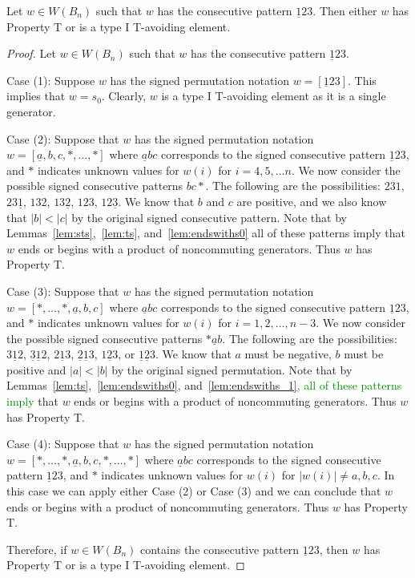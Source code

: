 \begin{lemma}\label{lem:123}
Let $w \in W(B_n)$ such that $w$ has the consecutive pattern $\underline{1}23$. Then either $w$ has Property T or is a type I T-avoiding element.
\begin{proof}
	Let $w \in W(B_n)$ such that $w$ has the consecutive pattern $\underline{1}23$.
	
	Case (1): Suppose $w$ has the signed permutation notation $w=[\underline{1}23]$. This implies that $w=s_0$. Clearly, $w$ is a type I T-avoiding element as it is a single generator.
	
	Case (2): Suppose that $w$ has the signed permutation notation $w=[\underline{a},b,c, \ast, \ldots, \ast]$ where $\underline{a}bc$ corresponds to the signed consecutive pattern $\underline{1}23$, and $\ast$ indicates unknown values for $w(i)$ for $i=4,5, \ldots n$. We now consider the possible signed consecutive patterns $bc \ast$. The following are the possibilities: $231$, $23 \underline{1}$, $132$, $13 \underline{2}$, $123$, $12 \underline{3}$. We know that $b$ and $c$ are positive, and we also know that $|b|<|c|$ by the original signed consecutive pattern. Note that by Lemmas~\ref{lem:sts},~\ref{lem:ts}, and~\ref{lem:endswiths0} all of these patterns imply that $w$ ends or begins with a product of noncommuting generators. Thus $w$ has Property T.
	
	Case (3): Suppose that $w$ has the signed permutation notation $w=[\ast, \ldots, \ast, \underline{a},b,c]$ where $\underline{a}bc$ corresponds to the signed consecutive pattern $\underline{1}23$, and $\ast$ indicates unknown values for $w(i)$ for $i=1,2, \ldots ,n-3$. We now consider the possible signed consecutive patterns $\ast \underline{a} b$. The following are the possibilities: $3 \underline{1} 2$, $\underline{3} \underline{1} 2$, $2 \underline{1} 3$, $\underline{2} \underline{1} 3$, $1 \underline{2} 3$, or $\underline{1} \underline{2} 3$. We know that $a$ must be negative, $b$ must be positive and $|a|<|b|$ by the original signed permutation. Note that by Lemmas~\ref{lem:ts},~\ref{lem:endswiths0}, and~\ref{lem:endswiths_1}\textcolor{green}{, all of these patterns imply} that $w$ ends or begins with a product of noncommuting generators. Thus $w$ has Property T. 
	
	Case (4): Suppose that $w$ has the signed permutation notation $w=[\ast, \ldots, \ast, \underline{a},b,c, \ast, \ldots, \ast]$ where $\underline{a}bc$ corresponds to the signed consecutive pattern $\underline{1}23$, and $\ast$ indicates unknown values for $w(i)$ for $|w(i)|\neq a,b,c$. In this case we can apply either Case (2) or Case (3) and we can conclude that $w$ ends or begins with a product of noncommuting generators. Thus $w$ has Property T.

	Therefore, if $w \in W(B_n)$ contains the consecutive pattern $\underline{1}23$, then $w$ has Property T or is a type I T-avoiding element.
\end{proof}	
\end{lemma}

